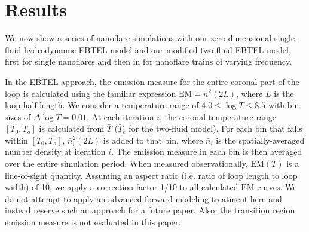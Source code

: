 \documentclass[apj]{emulateapj}
\begin{document}
	\section{Results}
	\label{sec:results}
	\par We now show a series of nanoflare simulations with our zero-dimensional single-fluid hydrodynamic EBTEL model and our modified two-fluid EBTEL model, first for single nanoflares and then in  for nanoflare trains of varying frequency.
	\par In the EBTEL approach, the emission measure for the entire coronal part of the loop is calculated using the familiar expression $\mathrm{EM}=n^2(2L)$, where $L$ is the loop half-length. We consider a temperature range of $4.0\le\log{T}\le8.5$ with bin sizes of $\Delta\log{T}=0.01$. At each iteration $i$, the coronal temperature range $[T_0,T_a]$ is calculated from $\bar{T}$ ($\bar{T}_e$ for the two-fluid model). For each bin that falls within $[T_0,T_a]$, $\bar{n}_i^2(2L)$ is added to that bin, where $\bar{n}_i$ is the spatially-averaged number density at iteration $i$. The emission measure in each bin is then averaged over the entire simulation period. When measured observationally, $\mathrm{EM}(T)$ is a line-of-sight quantity. Assuming an aspect ratio (i.e. ratio of loop length to loop width) of 10, we apply a correction factor 1/10 to all calculated $\mathrm{EM}$ curves. We do not attempt to apply an advanced forward modeling treatment here and instead reserve such an approach for a future paper. Also, the transition region emission measure is not evaluated in this paper.
\end{document}
